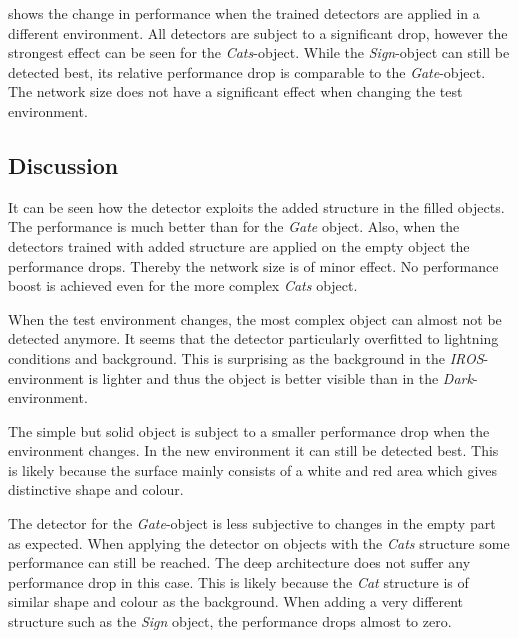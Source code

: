 \begin{table}[hbtp]
	\centering
	
	\caption{Change in performance when the detectors are tested in another environment than their training environment. The most severe drop can be seen at the \textit{Cats}-object. The drop for \acp{EWFO} is comparable to the \textit{Sign}-object}
	\label{tab:diff_iros}
\end{table}

 shows the change in performance when the trained detectors are applied in a different environment. All detectors are subject to a significant drop, however the strongest effect can be seen for the \textit{Cats}-object. While the \textit{Sign}-object can still be detected best, its relative performance drop is comparable to the \textit{Gate}-object. The network size does not have a significant effect when changing the test environment.

\subsection{Discussion}

It can be seen how the detector exploits the added structure in the filled objects. The performance is much better than for the \textit{Gate} object. Also, when the detectors trained with added structure are applied on the empty object the performance drops. Thereby the network size is of minor effect. No performance boost is achieved even for the more complex \textit{Cats} object.

When the test environment changes, the most complex object can almost not be detected anymore. It seems that the detector particularly overfitted to lightning conditions and background. This is surprising as the background in the \textit{IROS}-environment is lighter and thus the object is better visible than in the \textit{Dark}-environment.

The simple but solid object is subject to a smaller performance drop when the environment changes. In the new environment it can still be detected best. This is likely because the surface mainly consists of a white and red area which gives distinctive shape and colour.

The detector for the \textit{Gate}-object is less subjective to changes in the empty part as expected. When applying the detector on objects with the \textit{Cats} structure some performance can still be reached. The deep architecture does not suffer any performance drop in this case. This is likely because the \textit{Cat} structure is of similar shape and colour as the background. When adding a very different structure such as the \textit{Sign} object, the performance drops almost to zero.

